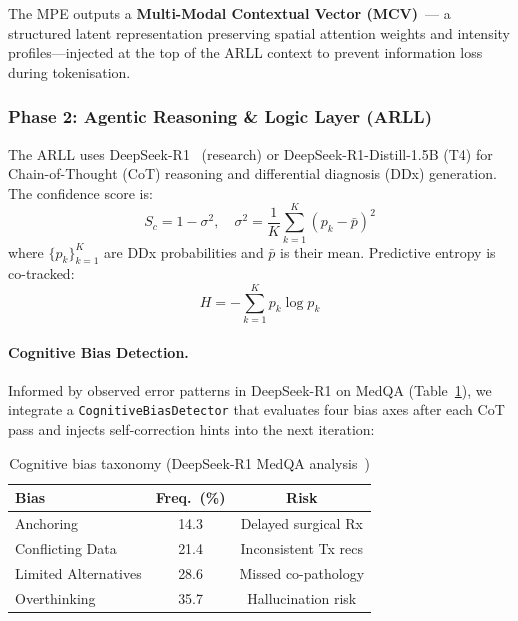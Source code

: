 \documentclass[10pt,twocolumn]{article}
\begin{document}
The MPE outputs a \textbf{Multi-Modal Contextual Vector (MCV)}~\cite{openreview2025icl}---
a structured latent representation preserving spatial attention weights and intensity
profiles---injected at the top of the ARLL context to prevent information loss
during tokenisation.

\subsubsection{Phase 2: Agentic Reasoning \& Logic Layer (ARLL)}

The ARLL uses DeepSeek-R1~\cite{gao2025deepseek} (research) or
DeepSeek-R1-Distill-1.5B (T4) for Chain-of-Thought (CoT) reasoning and
differential diagnosis (DDx) generation. The confidence score is:
\begin{equation}
  S_c = 1 - \sigma^2, \quad
  \sigma^2 = \frac{1}{K}\sum_{k=1}^{K}\!\left(p_k - \bar{p}\right)^2
  \label{eq:sc}
\end{equation}
where $\{p_k\}_{k=1}^{K}$ are DDx probabilities and $\bar{p}$ is their mean.
Predictive entropy is co-tracked:
\begin{equation}
  H = -\sum_{k=1}^{K} p_k \log p_k
  \label{eq:entropy}
\end{equation}

\paragraph{Cognitive Bias Detection.}
Informed by observed error patterns in DeepSeek-R1 on MedQA (Table~\ref{tab:bias}),
we integrate a \texttt{CognitiveBiasDetector} that evaluates four bias axes after
each CoT pass and injects self-correction hints into the next iteration:

\begin{table}[h]
  \centering
  \small
  \caption{Cognitive bias taxonomy (DeepSeek-R1 MedQA analysis~\cite{gao2025deepseek})}
  \label{tab:bias}
  \begin{tabular}{@{}lcc@{}}
    \toprule
    \textbf{Bias} & \textbf{Freq.~(\%)} & \textbf{Risk} \\
    \midrule
    Anchoring              & 14.3 & Delayed surgical Rx \\
    Conflicting Data       & 21.4 & Inconsistent Tx recs \\
    Limited Alternatives   & 28.6 & Missed co-pathology \\
    Overthinking           & 35.7 & Hallucination risk \\
    \bottomrule
  \end{tabular}
\end{table}
\end{document}

